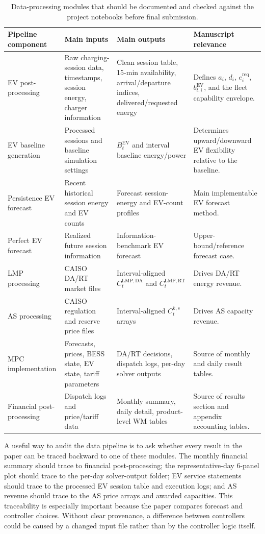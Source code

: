\documentclass[final,5p,times]{elsarticle}
\newcommand{\EV}{\mathrm{EV}}
\newcommand{\DA}{\mathrm{DA}}
\newcommand{\RT}{\mathrm{RT}}
\newcommand{\req}{\mathrm{req}}
\begin{document}
\begin{table}[!t]
\centering
\caption{Data-processing modules that should be documented and checked against the project notebooks before final submission.}
\label{tab:data_pipeline}
\scriptsize
\begin{tabularx}{\textwidth}{@{}p{}p{}p{}X@{}}
\toprule
Pipeline component & Main inputs & Main outputs & Manuscript relevance \\
\midrule
EV post-processing & Raw charging-session data, timestamps, session energy, charger information & Clean session table, 15-min availability, arrival/departure indices, delivered/requested energy & Defines $a_i$, $d_i$, $e_i^{\req}$, $b_{t,i}^{\EV}$, and the fleet capability envelope.\\
EV baseline generation & Processed sessions and baseline simulation settings & $B_t^{\EV}$ and interval baseline energy/power & Determines upward/downward EV flexibility relative to the baseline.\\
Persistence EV forecast & Recent historical session energy and EV counts & Forecast session-energy and EV-count profiles & Main implementable EV forecast method.\\
Perfect EV forecast & Realized future session information & Information-benchmark EV forecast & Upper-bound/reference forecast case.\\
LMP processing & CAISO DA/RT market files & Interval-aligned $C_t^{\mathrm{LMP},\DA}$ and $C_t^{\mathrm{LMP},\RT}$ & Drives DA/RT energy revenue.\\
AS processing & CAISO regulation and reserve price files & Interval-aligned $C_t^{k,s}$ arrays & Drives AS capacity revenue.\\
MPC implementation & Forecasts, prices, BESS state, EV state, tariff parameters & DA/RT decisions, dispatch logs, per-day solver outputs & Source of monthly and daily result tables.\\
Financial post-processing & Dispatch logs and price/tariff data & Monthly summary, daily detail, product-level WM tables & Source of results section and appendix accounting tables.\\
\bottomrule
\end{tabularx}
\end{table}

A useful way to audit the data pipeline is to ask whether every result in the paper can be traced backward to one of these modules. The monthly financial summary should trace to financial post-processing; the representative-day 6-panel plot should trace to the per-day solver-output folder; EV service statements should trace to the processed EV session table and execution logs; and AS revenue should trace to the AS price arrays and awarded capacities. This traceability is especially important because the paper compares forecast and controller choices. Without clear provenance, a difference between controllers could be caused by a changed input file rather than by the controller logic itself.
\end{document}

